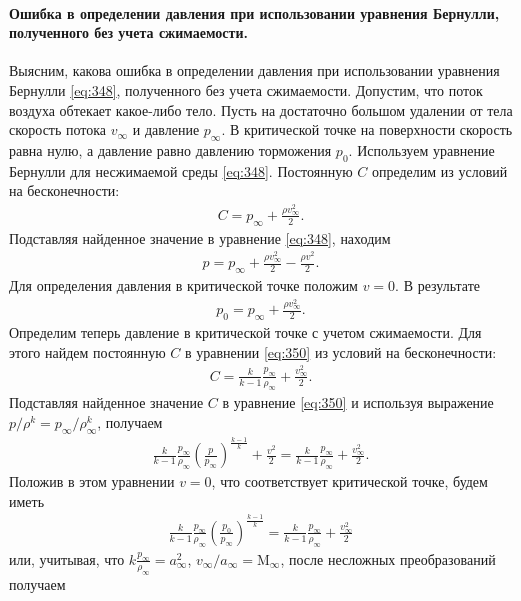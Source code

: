 	\paragraph{Ошибка в определении давления при использовании уравнения Бернулли, полученного без учета сжимаемости.} Выясним, какова ошибка в определении давления при использовании уравнения Бернулли \eqref{eq:348}, полученного без учета сжимаемости. Допустим, что поток воздуха обтекает какое-либо тело. Пусть на достаточно большом удалении от тела скорость потока $v_\infty$ и давление $p_\infty$. В критической точке на поверхности скорость равна нулю, а давление равно давлению торможения $p_0$. Используем уравнение Бернулли для несжимаемой среды \eqref{eq:348}. Постоянную $C$ определим из условий на бесконечности:
	\begin{gather*}
		C = p_\infty + \frac{\rho v_\infty^2}{2}.
	\end{gather*}\n
	Подставляя найденное значение в уравнение \eqref{eq:348}, находим
	\begin{gather*}
		p = p_\infty + \frac{\rho v_\infty^2}{2} - \frac{\rho v^2}{2}.
	\end{gather*}\n
	Для определения давления в критической точке положим $v = 0$. В результате
	\begin{gather}\label{eq:353}
		p_0 = p_\infty + \frac{\rho v_\infty^2}{2}.
	\end{gather}\n
	Определим теперь давление в критической точке с учетом сжимаемости. Для этого найдем постоянную $C$ в уравнении \eqref{eq:350} из условий на бесконечности:
	\begin{gather*}
		C = \frac{k}{k-1}\frac{p_\infty}{\rho_\infty} + \frac{v_\infty^2}{2}.
	\end{gather*}\n
	Подставляя найденное значение $C$ в уравнение \eqref{eq:350} и используя выражение $p/\rho^k = p_\infty/\rho_\infty^k$, получаем
	\begin{gather*}
		\frac{k}{k-1}\frac{p_\infty}{\rho_\infty}\left(\frac{p}{p_\infty}\right)^{\frac{k-1}{k}} + \frac{v^2}{2}= \frac{k}{k-1}\frac{p_\infty}{\rho_\infty} + \frac{v_\infty^2}{2}.
	\end{gather*}\n
	Положив в этом уравнении $v = 0$, что соответствует критической точке, будем иметь
	\begin{gather*}
		\frac{k}{k-1}\frac{p_\infty}{\rho_\infty}\left(\frac{p_0}{p_\infty}\right)^{\frac{k-1}{k}} = \frac{k}{k-1}\frac{p_\infty}{\rho_\infty} + \frac{v_\infty^2}{2}
	\end{gather*}
	или, учитывая, что $k\frac{p_\infty}{\rho_\infty} = a_\infty^2$, $v_\infty/a_\infty = \mathrm{M_\infty}$, после несложных преобразований получаем
